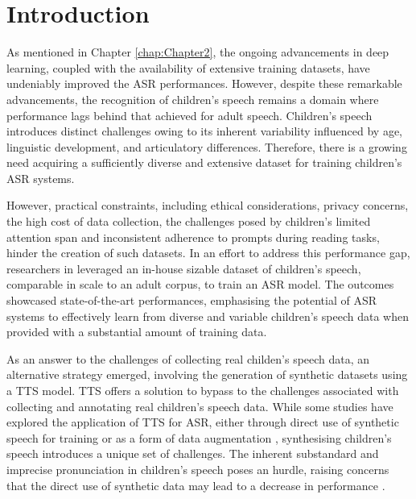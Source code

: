 \label{chap:6}
\cleardoublepage

\section{Introduction}
As mentioned in Chapter \ref{chap:Chapter2}, the ongoing advancements in deep learning, coupled with the availability of extensive training datasets, have undeniably improved the \ac{ASR} performances. However, despite these remarkable advancements, the recognition of children's speech remains a domain where performance lags behind that achieved for adult speech. Children's speech introduces distinct challenges owing to its inherent variability influenced by age, linguistic development, and articulatory differences. Therefore, there is a growing need acquiring a sufficiently diverse and extensive dataset for training children's \ac{ASR} systems. 

However, practical constraints, including ethical considerations, privacy concerns, the high cost of data collection, the challenges posed by children's limited attention span and inconsistent adherence to prompts during reading tasks, hinder the creation of such datasets. In an effort to address this performance gap, researchers in \cite{asr-google} leveraged an in-house sizable dataset of children's speech, comparable in scale to an adult corpus, to train an \ac{ASR} model. The outcomes showcased state-of-the-art performances, emphasising the potential of \ac{ASR} systems to effectively learn from diverse and variable children's speech data when provided with a substantial amount of training data.

As an answer to the challenges of collecting real childen's speech data, an alternative strategy emerged, involving the generation of synthetic datasets using a \ac{TTS} model. \ac{TTS} offers a solution to bypass to the challenges associated with collecting and annotating real children's speech data. While some studies have explored the application of \ac{TTS} for \ac{ASR}, either through direct use of synthetic speech for training or as a form of data augmentation \cite{laptev2020you,fazel21_interspeech}, synthesising children's speech introduces a unique set of challenges. The inherent substandard and imprecise pronunciation in children's speech \cite{wang2021towards} poses an hurdle, raising concerns that the direct use of synthetic data may lead to a decrease in performance \cite{wang2021towards, hu2022synt++}.

